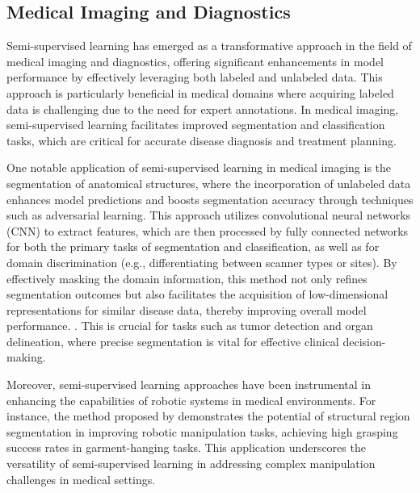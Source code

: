 \subsection{Medical Imaging and Diagnostics} \label{subsec:Medical Imaging and Diagnostics}

Semi-supervised learning has emerged as a transformative approach in the field of medical imaging and diagnostics, offering significant enhancements in model performance by effectively leveraging both labeled and unlabeled data. This approach is particularly beneficial in medical domains where acquiring labeled data is challenging due to the need for expert annotations. In medical imaging, semi-supervised learning facilitates improved segmentation and classification tasks, which are critical for accurate disease diagnosis and treatment planning.



One notable application of semi-supervised learning in medical imaging is the segmentation of anatomical structures, where the incorporation of unlabeled data enhances model predictions and boosts segmentation accuracy through techniques such as adversarial learning. This approach utilizes convolutional neural networks (CNN) to extract features, which are then processed by fully connected networks for both the primary tasks of segmentation and classification, as well as for domain discrimination (e.g., differentiating between scanner types or sites). By effectively masking the domain information, this method not only refines segmentation outcomes but also facilitates the acquisition of low-dimensional representations for similar disease data, thereby improving overall model performance. \cite{arai2021diseaseorientedimageembeddingpseudoscanner}. This is crucial for tasks such as tumor detection and organ delineation, where precise segmentation is vital for effective clinical decision-making.



Moreover, semi-supervised learning approaches have been instrumental in enhancing the capabilities of robotic systems in medical environments. For instance, the method proposed by \cite{chen2023learninggraspclothingstructural} demonstrates the potential of structural region segmentation in improving robotic manipulation tasks, achieving high grasping success rates in garment-hanging tasks. This application underscores the versatility of semi-supervised learning in addressing complex manipulation challenges in medical settings.



